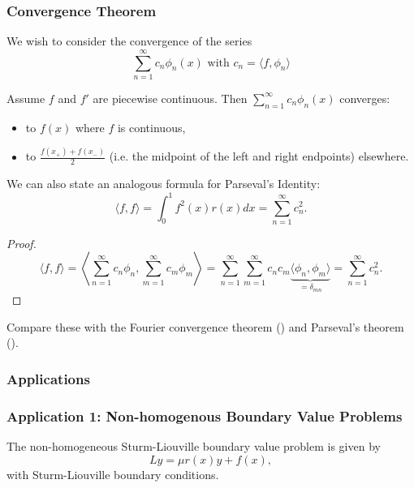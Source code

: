 \subsubsection{Convergence Theorem}

We wish to consider the convergence of the series
\[
\sum_{n=1}^{\infty} c_n \phi_n(x) \text{ with } c_n = \langle f, \phi_n\rangle
\]
\begin{theorem}
	Assume $f$ and $f'$ are piecewise continuous. Then $\sum_{n=1}^{\infty} c_n \phi_n(x)$ converges:
	\begin{itemize}
		\item to $f(x)$ where $f$ is continuous,
		\item to $\frac{f(x_+)+f(x_-)}{2}$ (i.e. the midpoint of the left and right endpoints) elsewhere.
	\end{itemize}
\end{theorem}

We can also state an analogous formula for Parseval's Identity:
\begin{equation}
	\langle f,f\rangle = \int_0^1 f^2(x)r(x)dx = \sum_{n=1}^{\infty} c_n^2.
\end{equation}

\begin{proof}
	\[
	\langle f,f\rangle = \left\langle \sum_{n=1}^{\infty} c_n \phi_n, \sum_{m=1}^{\infty} c_m \phi_m\right\rangle = \sum_{n=1}^{\infty} \sum_{m=1}^{\infty} c_n c_m \underbrace{\langle \phi_n, \phi_m\rangle}_{=\delta_{mn}} = \sum_{n=1}^{\infty} c_n^2.
	\]
\end{proof}

Compare these with the Fourier convergence theorem () and Parseval's theorem ().

\subsubsection{Applications}

\subsubsection*{Application 1: Non-homogenous Boundary Value Problems}

The non-homogeneous Sturm-Liouville boundary value problem is given by
\begin{equation}\label{eq6.2.2}
	Ly = \mu r(x) y + f(x),
\end{equation}
with Sturm-Liouville boundary conditions.


